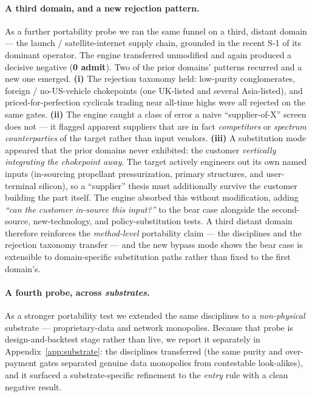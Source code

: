 \documentclass[11pt]{article}
\begin{document}
\paragraph{A third domain, and a new rejection pattern.} As a further portability
probe we ran the same funnel on a third, distant domain --- the launch /
satellite-internet supply chain, grounded in the recent S-1 of its dominant
operator. The engine transferred unmodified and again produced a decisive negative
(\textbf{0 admit}). Two of the prior domains' patterns recurred and a new one
emerged. \textbf{(i)} The rejection taxonomy held: low-purity conglomerates,
foreign / no-US-vehicle chokepoints (one UK-listed and several Asia-listed), and
priced-for-perfection cyclicals trading near all-time highs were all rejected on
the same gates. \textbf{(ii)} The engine caught a class of error a naive
``supplier-of-X'' screen does not --- it flagged apparent suppliers that are in
fact \emph{competitors} or \emph{spectrum counterparties} of the target rather than
input vendors. \textbf{(iii)} A substitution mode appeared that the prior domains
never exhibited: the customer \emph{vertically integrating the chokepoint away}.
The target actively engineers out its own named inputs (in-sourcing propellant
pressurization, primary structures, and user-terminal silicon), so a ``supplier''
thesis must additionally survive the customer building the part itself. The engine
absorbed this without modification, adding \emph{``can the customer in-source this
input?''} to the bear case alongside the second-source, new-technology, and
policy-substitution tests. A third distant domain therefore reinforces the
\emph{method-level} portability claim --- the disciplines and the rejection
taxonomy transfer --- and the new bypass mode shows the bear case is extensible to
domain-specific substitution paths rather than fixed to the first domain's.

\paragraph{A fourth probe, across \emph{substrates}.} As a stronger portability test we extended the
same disciplines to a \emph{non-physical} substrate --- proprietary-data and network monopolies.
Because that probe is design-and-backtest stage rather than live, we report it separately in
Appendix~\ref{app:substrate}: the disciplines transferred (the same purity and over-payment gates
separated genuine data monopolies from contestable look-alikes), and it surfaced a substrate-specific
refinement to the \emph{entry} rule with a clean negative result.
\end{document}

